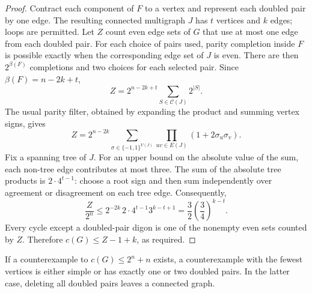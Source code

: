 \begin{proof}
Contract each component of $F$ to a vertex and represent each doubled pair by one edge.
The resulting connected multigraph $J$ has $t$ vertices and $k$ edges; loops are permitted.
Let $Z$ count even edge sets of $G$ that use at most one edge from each doubled pair.
For each choice of pairs used, parity completion inside $F$ is possible exactly when
the corresponding edge set of $J$ is even.
There are then $2^{\beta(F)}$ completions and two choices for each selected pair.
Since $\beta(F)=n-2k+t$,
\[
 Z=2^{n-2k+t}\sum_{S\in\mathcal C(J)}2^{|S|}.
\]
The usual parity filter, obtained by expanding the product and summing vertex signs, gives
\[
 Z=2^{n-2k}\sum_{\sigma\in\{-1,1\}^{V(J)}}
       \prod_{uv\in E(J)}(1+2\sigma_u\sigma_v).
\]
Fix a spanning tree of $J$.
For an upper bound on the absolute value of the sum, each non-tree edge contributes at most three.
The sum of the absolute tree products is $2\cdot4^{t-1}$:
choose a root sign and then sum independently over agreement or disagreement on each tree edge.
Consequently,
\[
 \frac{Z}{2^n}\le 2^{-2k}\,2\cdot4^{t-1}3^{k-t+1}
       =\frac32\left(\frac34\right)^{k-t}.
\]
Every cycle except a doubled-pair digon is one of the nonempty even sets counted by $Z$.
Therefore $c(G)\le Z-1+k$, as required.
\end{proof}

\begin{theorem}\label{thm:four-two-pairs}
If a counterexample to $c(G)\le2^n+n$ exists, a counterexample with the fewest vertices
is either simple or has exactly one or two doubled pairs.
In the latter case, deleting all doubled pairs leaves a connected graph.
\end{theorem}

